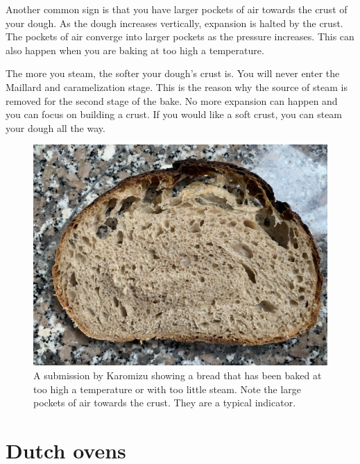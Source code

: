 Another common sign is that you have larger pockets
of air towards the crust of your dough. As the dough increases
vertically, expansion is halted by the crust. The pockets
of air converge into larger pockets as the pressure increases.
This can also happen when you are baking at too high a temperature.

The more you steam, the softer your dough's crust is. You will never
enter the Maillard and caramelization stage. This
is the reason why the source of steam is removed
for the second stage of the bake. No more expansion can
happen and you can focus on building a crust. If you
would like a soft crust, you can steam your dough all the
way.

\begin{figure}[!htb]
  \includegraphics[width=\textwidth]{baking-too-hot}
  \caption[Bread baked too hot]{A submission by Karomizu showing a bread that
      has been baked at too high a temperature or with too little steam. Note
      the large pockets of air towards the crust. They are a typical
      indicator.}
\end{figure}

\section{Dutch ovens}

